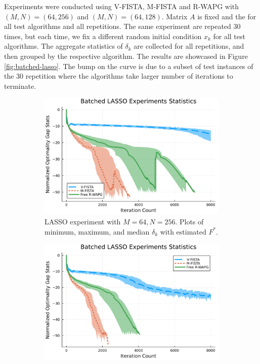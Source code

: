 \documentclass[12pt]{article}
\begin{document}
        Experiments were conducted using V-FISTA, M-FISTA and R-WAPG with $(M, N) = (64, 256)$ and $(M, N) = (64, 128)$. 
        Matrix $A$ is fixed and the for all test algorithms and all repetitions. 
        The same experiment are repeated 30 times, but each time, we fix a different random initial condition $x_k$ for all test algorithms. 
        The aggregate statistics of $\delta_k$ are collected for all repetitions, and then grouped by the respective algorithm. 
        The results are showcased in Figure \ref{fig:batched-lasso}. 
        The bump on the curve is due to a subset of test instances of the 30 repetition where the algorithms take larger number of iterations to terminate. 
        \begin{figure}[H]
            \begin{subfigure}[b]{0.47\textwidth}
                \centering
                \includegraphics[width=\textwidth]{assets/lasso_batched_statistics_64-256.png}
                \caption{LASSO experiment with $M = 64, N = 256$. Plots of minimum, maximum, and median $\delta_k$ with estimated $F^*$. }
            \end{subfigure}
            \hfill
            \begin{subfigure}[b]{0.47\textwidth}
                \centering
                \includegraphics[width=\textwidth]{assets/lasso_batched_statistics_64-128.png}

\end{subfigure}
\end{figure}
\end{document}
